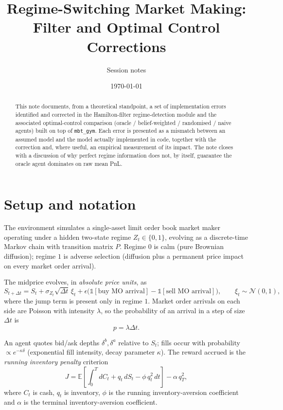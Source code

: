 \documentclass[11pt]{article}
\title{Regime-Switching Market Making: \\ Filter and Optimal Control Corrections}
\author{Session notes}
\date{\today}
\newcommand{\E}{\mathbb{E}}
\newcommand{\N}{\mathcal{N}}
\begin{document}
\maketitle

\begin{abstract}
This note documents, from a theoretical standpoint, a set of implementation errors identified and corrected in the Hamilton-filter regime-detection module and the associated optimal-control comparison (oracle / belief-weighted / randomised / naive agents) built on top of \texttt{mbt\_gym}. Each error is presented as a mismatch between an assumed model and the model actually implemented in code, together with the correction and, where useful, an empirical measurement of its impact. The note closes with a discussion of why perfect regime information does not, by itself, guarantee the oracle agent dominates on raw mean PnL.
\end{abstract}

\tableofcontents

\section{Setup and notation}

The environment simulates a single-asset limit order book market maker operating under a hidden two-state regime $Z_t \in \{0,1\}$, evolving as a discrete-time Markov chain with transition matrix $P$. Regime $0$ is calm (pure Brownian diffusion); regime $1$ is adverse selection (diffusion plus a permanent price impact on every market order arrival).

The midprice evolves, in \emph{absolute price units}, as
\begin{equation}
S_{t+\Delta t} = S_t + \sigma_{Z_t} \sqrt{\Delta t}\, \xi_t + \epsilon\big(\mathbb{1}[\text{buy MO arrival}] - \mathbb{1}[\text{sell MO arrival}]\big), \qquad \xi_t \sim \N(0,1),
\label{eq:midprice}
\end{equation}
where the jump term is present only in regime $1$. Market order arrivals on each side are Poisson with intensity $\lambda$, so the probability of an arrival in a step of size $\Delta t$ is
\begin{equation}
p = \lambda \Delta t.
\label{eq:jumpprob}
\end{equation}

An agent quotes bid/ask depths $\delta^{b}, \delta^{a}$ relative to $S_t$; fills occur with probability $\propto e^{-\kappa \delta}$ (exponential fill intensity, decay parameter $\kappa$). The reward accrued is the \emph{running inventory penalty} criterion
\begin{equation}
J = \E\left[\int_0^T dC_t + q_t\, dS_t - \phi\, q_t^2\, dt \right] - \alpha\, q_T^2,
\label{eq:objective}
\end{equation}
where $C_t$ is cash, $q_t$ is inventory, $\phi$ is the running inventory-aversion coefficient and $\alpha$ is the terminal inventory-aversion coefficient.
\end{document}

